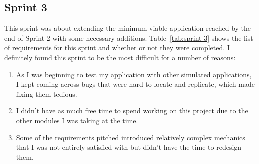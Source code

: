 \subsection*{Sprint 3}

This sprint was about extending the minimum viable application reached by the end of Sprint 2 with some necessary additions. Table~\ref{tab:sprint-3} shows the list of requirements for this sprint and whether or not they were completed.
\x
I definitely found this sprint to be the most difficult for a number of reasons:

\begin{enumerate}
  \item As I was beginning to test my application with other simulated applications, I kept coming across bugs that were hard to locate and replicate, which made fixing them tedious.
  \item I didn't have as much free time to spend working on this project due to the other modules I was taking at the time.
  \item Some of the requirements pitched introduced relatively complex mechanics that I was not entirely satisfied with but didn't have the time to redesign them.  
\end{enumerate}

